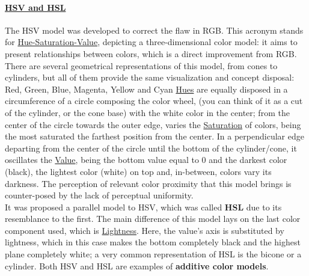 \paragraph{\ul{HSV and HSL}} The HSV model was developed to correct the flaw in RGB. This acronym
stands for \ul{Hue-Saturation-Value}, depicting a three-dimensional color model: it aims to
present relationships between colors, which is a direct improvement from RGB. There are several
geometrical representations of this model, from cones to cylinders, but all of them provide the same
visualization and concept disposal: Red, Green, Blue, Magenta, Yellow and Cyan \ul{Hues} are equally
disposed in a circumference of a circle composing the color wheel, (you can think of it as a cut of the cylinder, or the cone base)
with the white color in the center; from the center of the circle towards the outer edge, varies the
\ul{Saturation} of colors, being the most saturated the farthest position from the center. In a
perpendicular edge departing from the center of the circle until the bottom of the cylinder/cone, it
oscillates the \ul{Value}, being the bottom value equal to 0 and the darkest color (black), the lightest
color (white) on top and, in-between, colors vary its darkness. The perception of relevant color
proximity that this model brings is counter-posed by the lack of perceptual uniformity. \\
It was proposed a parallel model to HSV, which was called \textbf{HSL} due to its resemblance to the
first. The main difference of this model lays on the last color component used, which is
\ul{Lightness}. Here, the value’s axis is substituted by lightness, which in this case makes
the bottom completely black and the highest plane completely white; a very common representation of HSL
is the bicone or a cylinder. Both HSV and HSL are examples of \textbf{additive color models}. \par
%
